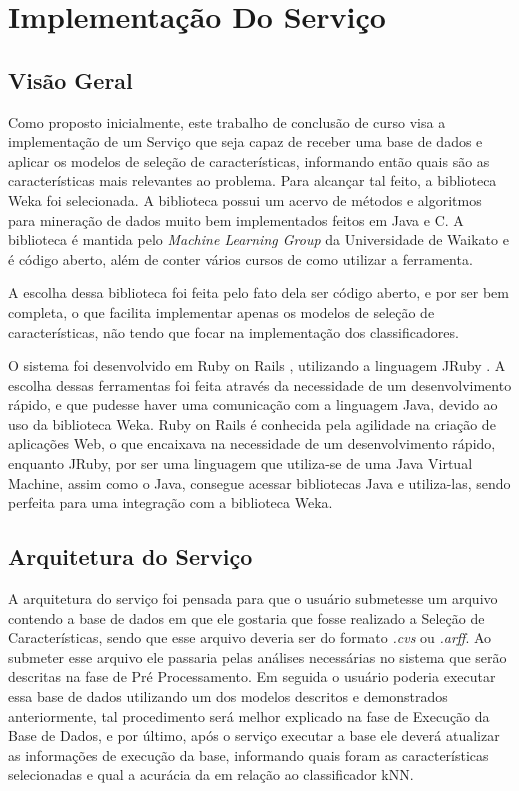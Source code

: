 \chapter[Implementação do Serviço]{Implementação Do Serviço}

\section{Visão Geral}

Como proposto inicialmente, este trabalho de conclusão de curso visa a implementação de um Serviço que seja capaz de receber uma base de dados e aplicar os modelos de seleção de características, informando então quais são as características mais relevantes ao problema. Para alcançar tal feito, a biblioteca Weka \cite{weka_2005} foi selecionada. A biblioteca possui um acervo de métodos e algoritmos para mineração de dados muito bem implementados feitos em Java e C. A biblioteca é mantida pelo \textit{Machine Learning Group} da Universidade de Waikato e é código aberto, além de conter vários cursos de como utilizar a ferramenta.

A escolha dessa biblioteca foi feita pelo fato dela ser código aberto, e por ser bem completa, o que facilita implementar apenas os modelos de seleção de características, não tendo que focar na implementação dos classificadores.

O sistema foi desenvolvido em Ruby on Rails \cite{ror}, utilizando a linguagem JRuby \cite{jruby}. A escolha dessas ferramentas foi feita através da necessidade de um desenvolvimento rápido, e que pudesse haver uma comunicação com a linguagem Java, devido ao uso da biblioteca Weka. Ruby on Rails é conhecida pela agilidade na criação de aplicações Web, o que encaixava na necessidade de um desenvolvimento rápido, enquanto JRuby, por ser uma linguagem que utiliza-se de uma Java Virtual Machine, assim como o Java, consegue acessar bibliotecas Java e utiliza-las, sendo perfeita para uma integração com a biblioteca Weka.

\section{Arquitetura do Serviço}
A arquitetura do serviço foi pensada para que o usuário submetesse um arquivo contendo a base de dados em que ele gostaria que fosse realizado a Seleção de Características, sendo que esse arquivo deveria ser do formato \textit{.cvs} ou \textit{.arff}. Ao submeter esse arquivo ele passaria pelas análises necessárias no sistema que serão descritas na fase de Pré Processamento. Em seguida o usuário poderia executar essa base de dados utilizando um dos modelos descritos e demonstrados anteriormente, tal procedimento será melhor explicado na fase de Execução da Base de Dados, e por último, após o serviço executar a base ele deverá atualizar as informações de execução da base, informando quais foram as características selecionadas e qual a acurácia da em relação ao classificador kNN.

